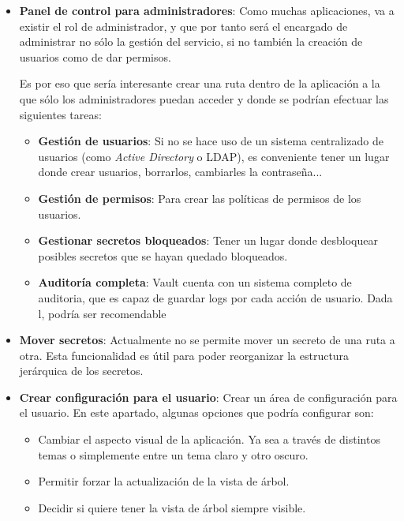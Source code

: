 \documentclass{\ClassPath/viu-tfm-template}
\begin{document}
\begin{itemize}
    \item \textbf{Panel de control para administradores}: Como muchas aplicaciones, va a existir el rol de administrador, y que por tanto será el encargado de administrar no sólo la gestión del servicio, si no también la creación de usuarios como de dar permisos.

    Es por eso que sería interesante crear una ruta dentro de la aplicación a la que sólo los administradores puedan acceder y donde se podrían efectuar las siguientes tareas:

    \begin{itemize}
        \item \textbf{Gestión de usuarios}: Si no se hace uso de un sistema centralizado de usuarios (como \textit{Active Directory} o LDAP), es conveniente tener un lugar donde crear usuarios, borrarlos, cambiarles la contraseña...
        \item \textbf{Gestión de permisos}: Para crear las políticas de permisos de los usuarios.
        \item \textbf{Gestionar secretos bloqueados}: Tener un lugar donde desbloquear posibles secretos que se hayan quedado bloqueados.
        \item \textbf{Auditoría completa}: Vault cuenta con un sistema completo de auditoria, que es capaz de guardar logs por cada acción de usuario. Dada l, podría ser recomendable
    \end{itemize}

    \item \textbf{Mover secretos}: Actualmente no se permite mover un secreto de una ruta a otra. Esta funcionalidad es útil para poder reorganizar la estructura jerárquica de los secretos.

    \item \textbf{Crear configuración para el usuario}: Crear un área de configuración para el usuario. En este apartado, algunas opciones que podría configurar son:

    \begin{itemize}
        \item Cambiar el aspecto visual de la aplicación. Ya sea a través de distintos temas o simplemente entre un tema claro y otro oscuro.
        \item Permitir forzar la actualización de la vista de árbol.
        \item Decidir si quiere tener la vista de árbol siempre visible.
    \end{itemize}


\end{itemize}
\end{document}
